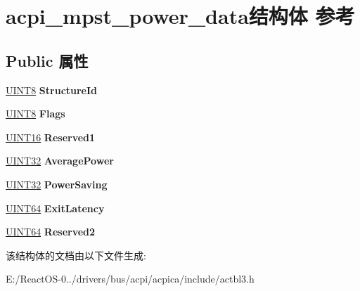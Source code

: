 \hypertarget{structacpi__mpst__power__data}{}\section{acpi\+\_\+mpst\+\_\+power\+\_\+data结构体 参考}
\label{structacpi__mpst__power__data}
\subsection*{Public 属性}
\begin{DoxyCompactItemize}
\item 
\mbox{\label{structacpi__mpst__power__data_a56fbbdd312dcb7e9715c6400d1c4233d}} 
\hyperlink{_processor_bind_8h_ab27e9918b538ce9d8ca692479b375b6a}{U\+I\+N\+T8} {\bfseries Structure\+Id}
\item 
\mbox{\label{structacpi__mpst__power__data_a589a4f5748e495dbe780e83d224abb2d}} 
\hyperlink{_processor_bind_8h_ab27e9918b538ce9d8ca692479b375b6a}{U\+I\+N\+T8} {\bfseries Flags}
\item 
\mbox{\label{structacpi__mpst__power__data_a79dac03c260e6ff90bab41a9833e6a66}} 
\hyperlink{_processor_bind_8h_a09f1a1fb2293e33483cc8d44aefb1eb1}{U\+I\+N\+T16} {\bfseries Reserved1}
\item 
\mbox{\label{structacpi__mpst__power__data_a8eedfa5934766d486713626ec2464082}} 
\hyperlink{_processor_bind_8h_ae1e6edbbc26d6fbc71a90190d0266018}{U\+I\+N\+T32} {\bfseries Average\+Power}
\item 
\mbox{\label{structacpi__mpst__power__data_ad57a8d9e8e9bcbb6c5f5a2c0edc256fb}} 
\hyperlink{_processor_bind_8h_ae1e6edbbc26d6fbc71a90190d0266018}{U\+I\+N\+T32} {\bfseries Power\+Saving}
\item 
\mbox{\label{structacpi__mpst__power__data_aa4401445c376e5baf538536982805997}} 
\hyperlink{_processor_bind_8h_a57be03562867144161c1bfee95ca8f7c}{U\+I\+N\+T64} {\bfseries Exit\+Latency}
\item 
\mbox{\label{structacpi__mpst__power__data_ab2d503a820da286ef21ecc3ffcf8f683}} 
\hyperlink{_processor_bind_8h_a57be03562867144161c1bfee95ca8f7c}{U\+I\+N\+T64} {\bfseries Reserved2}
\end{DoxyCompactItemize}


该结构体的文档由以下文件生成\+:\begin{DoxyCompactItemize}
\item 
E\+:/\+React\+O\+S-\/0../drivers/bus/acpi/acpica/include/actbl3.\+h\end{DoxyCompactItemize}
